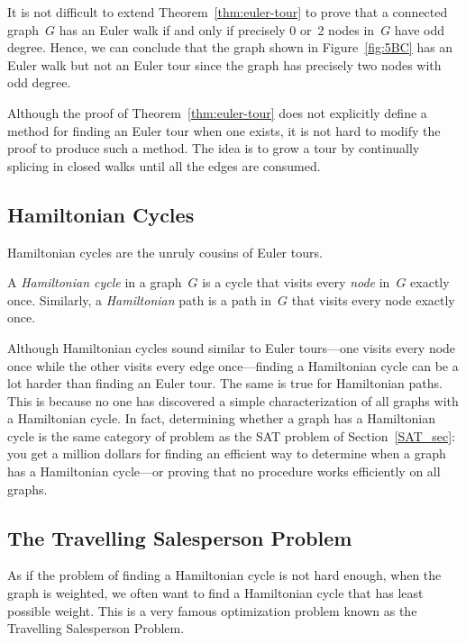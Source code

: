 It is not difficult to extend Theorem~\ref{thm:euler-tour} to prove that a
connected graph~$G$ has an Euler walk if and only if precisely 0 or~2
nodes in~$G$ have odd degree.  Hence, we can conclude that the graph
shown in Figure~\ref{fig:5BC} has an Euler walk but not an Euler tour
since the graph has precisely two nodes with odd degree.

Although the proof of Theorem~\ref{thm:euler-tour} does not explicitly
define a method for finding an Euler tour when one exists, it is not
hard to modify the proof to produce such a method.  The idea is to
grow a tour by continually splicing in closed walks until all the
edges are consumed.

\subsection{Hamiltonian Cycles}

Hamiltonian cycles are the unruly cousins of Euler tours.

\begin{definition}\label{def:hamiltonian-cycle}
A \emph{Hamiltonian cycle} in a graph~$G$ is a cycle that visits every
\emph{node} in~$G$ exactly once.  Similarly, a \emph{Hamiltonian} path
is a path in~$G$ that visits every node exactly once.
\end{definition}

Although Hamiltonian cycles sound similar to Euler tours---one visits
every node once while the other visits every edge once---finding a
Hamiltonian cycle can be a lot harder than finding an Euler tour.  The
same is true for Hamiltonian paths.  This is because no one has
discovered a simple characterization of all graphs with a Hamiltonian
cycle.  In fact, determining whether a graph has a Hamiltonian cycle
is the same category of problem as the SAT problem of
Section~\ref{SAT_sec}: you get a million dollars for finding an
efficient way to determine when a graph has a Hamiltonian cycle---or
proving that no procedure works efficiently on all graphs.

\subsection{The Travelling Salesperson Problem}

As if the problem of finding a Hamiltonian cycle is not hard enough,
when the graph is weighted, we often want to find a Hamiltonian cycle
that has least possible weight.  This is a very famous optimization
problem known as the Travelling Salesperson Problem.

